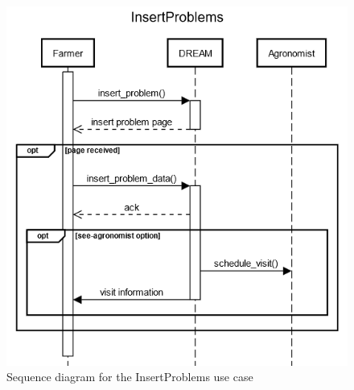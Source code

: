 \documentclass{article}
\begin{document}
\begin{figure}[H]
    \centering
    \includegraphics[scale=0.75]{sequence_diagrams/InsertProblems}
    \caption{Sequence diagram for the InsertProblems use case}
\end{figure}
\newpage
\end{document}
